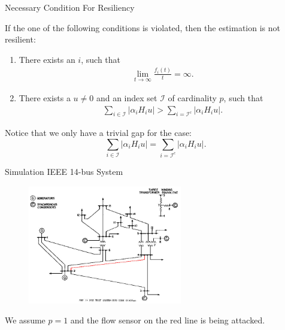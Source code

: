 \documentclass[10pt]{beamer}
\begin{document}
\begin{frame}{Necessary Condition For Resiliency}
  \begin{theorem}
    If the one of the following conditions is violated, then the estimation is not resilient:
    \begin{enumerate}
    \item There exists an $i$, such that
      \begin{align*}
        \lim_{t\rightarrow\infty}\frac{f_i(t)}{t} = \infty.
      \end{align*}
    \item There exists a $u\neq 0$ and an index set $\mathcal I$ of cardinality $p$, such that
      \begin{align*}
        \sum_{i\in \mathcal I} |\alpha_i H_i u| > \sum_{i=\mathcal I^c} |\alpha_i H_i u|.
      \end{align*}
    \end{enumerate}
  \end{theorem}
  Notice that we only have a trivial gap for the case:
  \[ \sum_{i\in \mathcal I} |\alpha_i H_i u| = \sum_{i=\mathcal I^c} |\alpha_i H_i u|.\]
\end{frame}

\begin{frame}{Simulation IEEE 14-bus System}
  \begin{figure}[ht]
    \centering
    \includegraphics[width=0.60\textwidth]{ieee14.jpg}
  \end{figure}
  We assume $p=1$ and the flow sensor on the red line is being attacked.
\end{frame}
\end{document}
